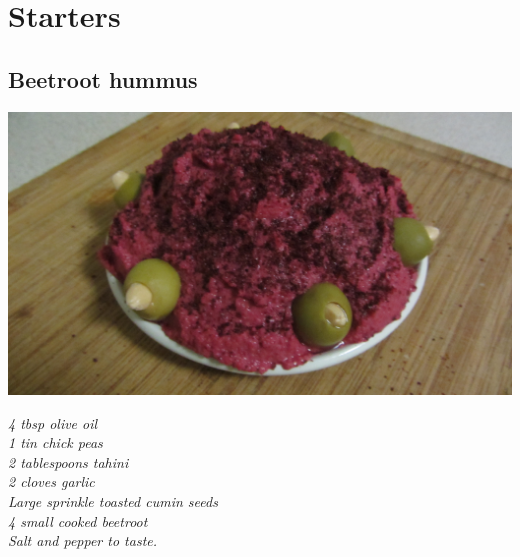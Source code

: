 \documentclass{tufte-book}
\begin{document}
\begin{figure}[p]
\hfill
{}
\end{figure}



\chapter{Starters}
\section{Beetroot hummus}

\begin{marginfigure}%
  \includegraphics[width=\linewidth]{beetroothummus.png}
\end{marginfigure}

\emph{4 tbsp olive oil
\\1 tin chick peas
\\2 tablespoons tahini
\\2 cloves garlic
\\Large sprinkle toasted cumin seeds
\\4 small cooked beetroot
\\Salt and pepper to taste.
}
\end{document}
